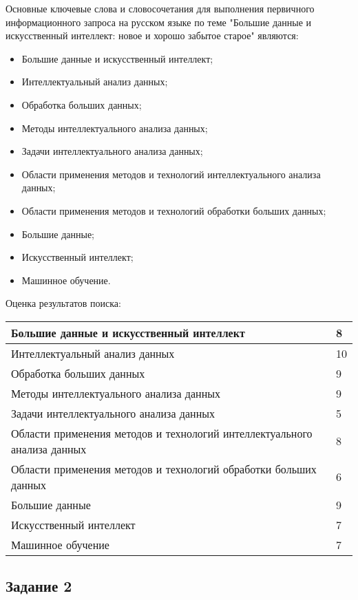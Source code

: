 \documentclass[14pt,a4paper,report]{report}
\begin{document}
Основные ключевые слова и словосочетания для выполнения первичного информационного запроса на русском языке по теме "Большие данные и искусственный интеллект: новое и хорошо забытое старое" являются:
\begin{itemize}
	\item Большие данные и искусственный интеллект;
	\item Интеллектуальный анализ данных;
	\item Обработка больших данных;
	\item Методы интеллектуального анализа данных;
	\item Задачи интеллектуального анализа данных;
	\item Области применения методов и технологий интеллектуального анализа данных;
	\item Области применения методов и технологий обработки больших данных;
	\item Большие данные;
	\item Искусственный интеллект;
	\item Машинное обучение.
\end{itemize}

Оценка результатов поиска:\\

\begin{tabular}{ | l | l | }
\hline
Большие данные и искусственный интеллект & 8 \\ \hline
Интеллектуальный анализ данных & 10 \\ \hline
Обработка больших данных & 9 \\ \hline
Методы интеллектуального анализа данных & 9\\ \hline
Задачи интеллектуального анализа данных & 5 \\ \hline
Области применения методов и технологий интеллектуального анализа данных & 8 \\ \hline
Области применения методов и технологий обработки больших данных & 6 \\ \hline
Большие данные & 9 \\ \hline
Искусственный интеллект & 7 \\ \hline
Машинное обучение & 7 \\
\hline
\end{tabular}



\subsection{Задание 2}
\end{document}
